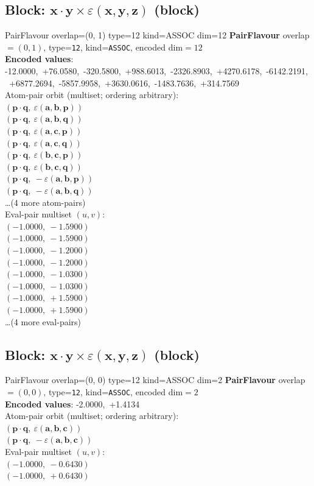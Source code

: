 \documentclass[a4paper,11pt]{article}
\newcommand{\pdcegfomjfhook}[2]{\mathbf{#1} \cdot \mathbf{#2}}
\newcommand{\kblbmcpggoncpf}[3]{\varepsilon(\mathbf{#1},\mathbf{#2},\mathbf{#3})}
\begin{document}
\subsection{Block: $\pdcegfomjfhook{x}{y} \times \kblbmcpggoncpf{x}{y}{z}$  (block)}
    PairFlavour  overlap=(0, 1)  type=12  kind=ASSOC  dim=12
\textbf{PairFlavour} overlap$=(0, 1)$, type=\texttt{12}, kind=\texttt{ASSOC}, encoded dim$=12$\\
\textbf{      Encoded values}: -12.0000,\ +76.0580,\ -320.5800,\ +988.6013,\ -2326.8903,\ +4270.6178,\ -6142.2191,\ +6877.2694,\ -5857.9958,\ +3630.0616,\ -1483.7636,\ +314.7569\\
\quad Atom-pair orbit (multiset; ordering arbitrary):\\
$(\pdcegfomjfhook{p}{q},\ \kblbmcpggoncpf{a}{b}{p})$\\
$(\pdcegfomjfhook{p}{q},\ \kblbmcpggoncpf{a}{b}{q})$\\
$(\pdcegfomjfhook{p}{q},\ \kblbmcpggoncpf{a}{c}{p})$\\
$(\pdcegfomjfhook{p}{q},\ \kblbmcpggoncpf{a}{c}{q})$\\
$(\pdcegfomjfhook{p}{q},\ \kblbmcpggoncpf{b}{c}{p})$\\
$(\pdcegfomjfhook{p}{q},\ \kblbmcpggoncpf{b}{c}{q})$\\
$(\pdcegfomjfhook{p}{q},\ -\kblbmcpggoncpf{a}{b}{p})$\\
$(\pdcegfomjfhook{p}{q},\ -\kblbmcpggoncpf{a}{b}{q})$\\
\quad \ldots (4 more atom-pairs)\\
\quad Eval-pair multiset $(u, v)$:\\
$(-1.0000,\ -1.5900)$\\
$(-1.0000,\ -1.5900)$\\
$(-1.0000,\ -1.2000)$\\
$(-1.0000,\ -1.2000)$\\
$(-1.0000,\ -1.0300)$\\
$(-1.0000,\ -1.0300)$\\
$(-1.0000,\ +1.5900)$\\
$(-1.0000,\ +1.5900)$\\
\quad \ldots (4 more eval-pairs)\\

\subsection{Block: $\pdcegfomjfhook{x}{y} \times \kblbmcpggoncpf{x}{y}{z}$  (block)}
    PairFlavour  overlap=(0, 0)  type=12  kind=ASSOC  dim=2
\textbf{PairFlavour} overlap$=(0, 0)$, type=\texttt{12}, kind=\texttt{ASSOC}, encoded dim$=2$\\
\textbf{      Encoded values}: -2.0000,\ +1.4134\\
\quad Atom-pair orbit (multiset; ordering arbitrary):\\
$(\pdcegfomjfhook{p}{q},\ \kblbmcpggoncpf{a}{b}{c})$\\
$(\pdcegfomjfhook{p}{q},\ -\kblbmcpggoncpf{a}{b}{c})$\\
\quad Eval-pair multiset $(u, v)$:\\
$(-1.0000,\ -0.6430)$\\
$(-1.0000,\ +0.6430)$\\
\end{document}
